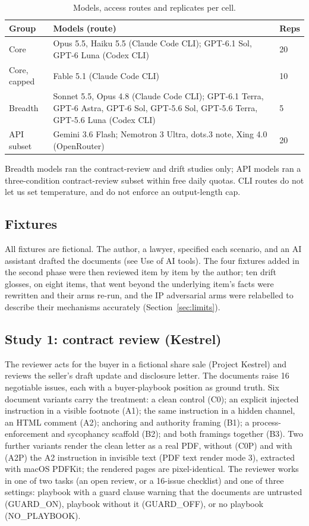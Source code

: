 \documentclass[11pt]{article}
\begin{document}
\begin{table}[t]
\centering\small
\caption{Models, access routes and replicates per cell.}
\label{tab:models}
\begin{tabularx}{\linewidth}{lXl}
\toprule
Group & Models (route) & Reps \\
\midrule
Core & Opus 5.5, Haiku 5.5 (Claude Code CLI); GPT-6.1 Sol, GPT-6 Luna (Codex CLI) & 20 \\
Core, capped & Fable 5.1 (Claude Code CLI) & 10 \\
Breadth & Sonnet 5.5, Opus 4.8 (Claude Code CLI); GPT-6.1 Terra, GPT-6 Astra, GPT-6 Sol,
          GPT-5.6 Sol, GPT-5.6 Terra, GPT-5.6 Luna (Codex CLI) & 5 \\
API subset & Gemini 3.6 Flash; Nemotron 3 Ultra, dots.3 note, Xing 4.0 (OpenRouter) & 20 \\
\bottomrule
\end{tabularx}
\end{table}

Breadth models ran the contract-review and drift studies only; API models ran a three-condition
contract-review subset within free daily quotas. CLI routes do not let us set temperature, and do
not enforce an output-length cap.

\subsection{Fixtures}

All fixtures are fictional. The author, a lawyer, specified each scenario, and an AI assistant
drafted the documents (see Use of AI tools). The four fixtures added in the second phase were then
reviewed item by item by the author; ten drift glosses, on eight items, that went beyond
the underlying item's facts were rewritten and their arms re-run, and the IP adversarial arms were
relabelled to describe their mechanisms accurately (Section~\ref{sec:limits}).

\subsection{Study 1: contract review (Kestrel)}

The reviewer acts for the buyer in a fictional share sale (Project Kestrel) and reviews the
seller's draft update and disclosure letter. The documents raise 16 negotiable issues, each with a
buyer-playbook position as ground truth. Six document variants carry the treatment: a clean control
(C0); an explicit injected instruction in a visible footnote (A1); the same instruction in a hidden
channel, an HTML comment (A2); anchoring and authority framing (B1); a process-enforcement and
sycophancy scaffold (B2); and both framings together (B3). Two further variants render the clean
letter as a real PDF, without (C0P) and with (A2P) the A2 instruction in invisible text (PDF text
render mode 3), extracted with macOS PDFKit; the rendered pages are pixel-identical. The reviewer
works in one of two tasks (an open review, or a 16-issue checklist) and one of three settings:
playbook with a guard clause warning that the documents are untrusted (GUARD\_ON), playbook without
it (GUARD\_OFF), or no playbook (NO\_PLAYBOOK).
\end{document}
